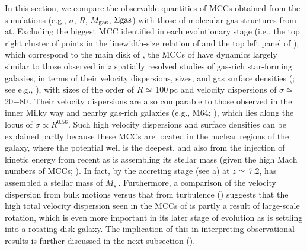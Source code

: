 \IfFileExists{emulateapjlegacy.cls}{\documentclass[iop]{emulateapjlegacy}}{\documentclass[iop]{emulateapj}}
\begin{document}
In this section, we compare the observable quantities of MCCs obtained from the simulations (e.g., $\sigma$, $R$, $M_{\rm gas}$, 
$\Sigma{\rm gas}$) with those of molecular gas structures from \obs at.
Excluding the biggest MCC identified in each evolutionary stage (i.e., the top right cluster of points in the 
linewidth-size relation of  and the top left panel of ), which correspond to 
the main disk of \flower, the MCCs of \flower have dynamics largely similar to those observed in
$z$ spatially resolved studies of gas-rich star-forming
galaxies, in terms of their velocity dispersions, sizes, and gas
surface densities (; see e.g.,
\citealt{Swinbank11a}), with sizes of the order of $R\simeq$\,100\,pc
and velocity dispersions of $\sigma\simeq$\,20$-$80\,\kms. 
Their velocity dispersions are also comparable to those observed in the inner 
Milky way and nearby gas-rich galaxies (e.g., M64; \citealt{Oka01a, Rosolowsky05a, Heyer09a}), which lies along the 
locus of $\sigma\propto R^{0.56}$. 
Such high velocity dispersions and surface densities can be explained partly because 
these MCCs are located in the nuclear regions of the galaxy, where the potential well is the deepest, 
and also from the injection of kinetic energy from recent
\SF as \flower is assembling its stellar mass (given the high Mach numbers of MCCs; ).
In fact, by the accreting stage (see a) at $z\simeq$\,7.2, 
\flower has assembled a stellar mass of
$M_\star$\,\Msun. 
Furthermore, a comparison of the velocity dispersion from bulk motions versus that from turbulence () suggests that 
the high total velocity dispersion seen in the MCCs of \flower is partly a result of large-scale rotation, which is even more important in 
its later stage of evolution as \flower is settling into a rotating disk galaxy. The implication of this in 
interpreting observational results is further discussed in the next subsection ().
\end{document}
